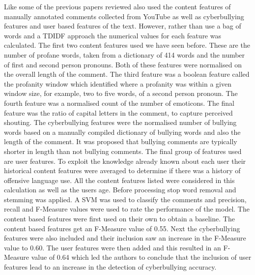 Like some of the previous papers reviewed \citet{dadvar_improving_2013} also used the content features of manually annotated comments collected from YouTube as well as cyberbullying features and user based features of the text. However, rather than use a bag of words and a TDIDF approach the numerical values for each feature was calculated. The first two content features used we have seen before. These are the number of profane words, taken from a dictionary of 414 words and the number of first and second person pronouns. Both of these features were normalised on the overall length of the comment. The third feature was a boolean feature called the profanity window which identified where a profanity was within a given window size, for example, two to five words, of a second person pronoun. The fourth feature was a normalised count of the number of emoticons. The final feature was the ratio of capital letters in the comment, to capture perceived shouting.  The cyberbullying features were the normalised number of bullying words based on a manually compiled dictionary of bullying words and also the length of the comment. It was proposed that bullying comments are typically shorter in length than not bullying comments. The final group of features used are user features. To exploit the knowledge already known about each user their historical content features were averaged to determine if there was a history of offensive language use. All the content features listed were considered in this calculation as well as the users age. Before processing stop word removal and stemming was applied. A SVM was used to classify the comments and precision, recall and F-Measure values were used to rate the performance of the model. The content based features were first used on their own to obtain a baseline. The content based features get an F-Measure value of 0.55. Next the cyberbullying features were also included and their inclusion saw an increase in the F-Measure value to 0.60. The user features were then added and this resulted in an F-Measure value of 0.64 which led the authors to conclude that the inclusion of user features lead to an increase in the detection of cyberbullying accuracy.

